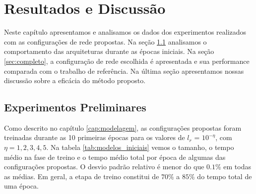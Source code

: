 \chapter{Resultados e Discussão} \label{cap:resultados}

Neste capítulo apresentamos e analisamos os dados dos experimentos realizados com as configurações de rede propostas. Na seção \ref{sec:parcial} analisamos o comportamento das arquiteturas durante as épocas iniciais. Na seção \ref{sec:completo}, a configuração de rede escolhida é apresentada e sua performance comparada com o trabalho de referência. Na última seção apresentamos nossas discussão sobre a eficácia do método proposto.

\section{Experimentos Preliminares}\label{sec:parcial}

Como descrito no capítulo \ref{cap:modelagem}, as configurações propostas foram treinadas durante as 10 primeiras épocas para os valores de $l_r$ = $10^{-\eta}$, com $\eta=1,2,3,4,5$. Na tabela \ref{tab:modelos_iniciais} vemos o tamanho, o tempo médio na fase de treino e o tempo médio total por época de algumas das configurações propostas. O desvio padrão relativo é menor do que $0.1\%$ em todas as médias. Em geral, a etapa de treino constitui de $70\%$ a $85\%$ do tempo total de uma época.

